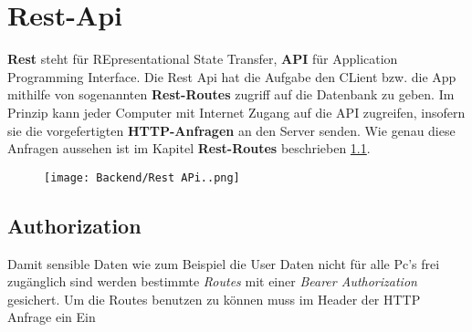 \section{Rest-Api}
\label{restapi}

\textbf{Rest} steht für REpresentational State Transfer, \textbf{API} für Application
Programming Interface. Die Rest Api hat die Aufgabe den CLient bzw. die App
mithilfe von sogenannten \textbf{Rest-Routes} zugriff auf die Datenbank zu geben.
Im Prinzip kann jeder Computer mit Internet Zugang auf die API zugreifen, insofern
sie die vorgefertigten \textbf{HTTP-Anfragen} an den Server senden. Wie genau diese
Anfragen aussehen ist im Kapitel \textbf{Rest-Routes} beschrieben \ref*{}.

\begin{figure}[H]
    \begin{center}
        \texttt{[image: Backend/Rest APi..png]}

    \end{center}
\end{figure}


\subsection{Authorization}

Damit sensible Daten wie zum Beispiel die User Daten nicht für
alle Pc's frei zugänglich sind werden bestimmte \textit{Routes} mit einer
\textit{Bearer Authorization} gesichert. Um die Routes benutzen zu können muss
im Header der HTTP Anfrage ein Ein
